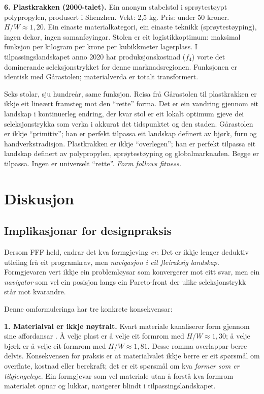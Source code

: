 \documentclass[10pt, a4paper, twocolumn]{article}
\begin{document}
\textbf{6. Plastkrakken (2000-talet).} Ein anonym stabelstol i sprøytestøypt polypropylen, produsert i Shenzhen. Vekt: 2,5 kg. Pris: under 50 kroner. $H/W \approx 1{,}20$. Ein einaste materialkategori, ein einaste teknikk (sprøytestøyping), ingen dekor, ingen samanføyingar. Stolen er eit logistikkoptimum: maksimal funksjon per kilogram per krone per kubikkmeter lagerplass. I tilpassingslandskapet anno 2020 har produksjonskostnad ($f_4$) vorte det dominerande seleksjonstrykket for denne marknadsregionen. Funksjonen er identisk med Gårastolen; materialverda er totalt transformert.

Seks stolar, sju hundreår, same funksjon. Reisa frå Gårastolen til plastkrakken er ikkje eit lineært framsteg mot den ``rette'' forma. Det er ein vandring gjennom eit landskap i kontinuerleg endring, der kvar stol er eit lokalt optimum gjeve dei seleksjonstrykka som verka i akkurat det tidspunktet og den staden. Gårastolen er ikkje ``primitiv''; han er perfekt tilpassa eit landskap definert av bjørk, furu og handverkstradisjon. Plastkrakken er ikkje ``overlegen''; han er perfekt tilpassa eit landskap definert av polypropylen, sprøytestøyping og globalmarknaden. Begge er tilpassa. Ingen er universelt ``rette''. \emph{Form follows fitness.}


\section{Diskusjon}

\subsection{Implikasjonar for designpraksis}

Dersom FFF held, endrar det kva formgjeving \emph{er}. Det er ikkje lenger deduktiv utleiing frå eit programkrav, men \emph{navigasjon i eit fleiraksig landskap}. Formgjevaren vert ikkje ein problemløysar som konvergerer mot eitt svar, men ein \emph{navigator} som vel ein posisjon langs ein Pareto-front der ulike seleksjonstrykk står mot kvarandre.

Denne omformuleringa har tre konkrete konsekvensar:

\textbf{1. Materialval er ikkje nøytralt.} Kvart materiale kanaliserer form gjennom sine affordansar \citep{gibson1977}. Å velje plast er å velje eit formrom med $H/W \approx 1{,}30$; å velje bjørk er å velje eit formrom med $H/W \approx 1{,}81$. Desse romma overlappar berre delvis. Konsekvensen for praksis er at materialvalet ikkje berre er eit spørsmål om overflate, kostnad eller berekraft; det er eit spørsmål om kva \emph{former som er tilgjengelege}. Ein formgjevar som vel materiale utan å forstå kva formrom materialet opnar og lukkar, navigerer blindt i tilpassingslandskapet.
\end{document}
